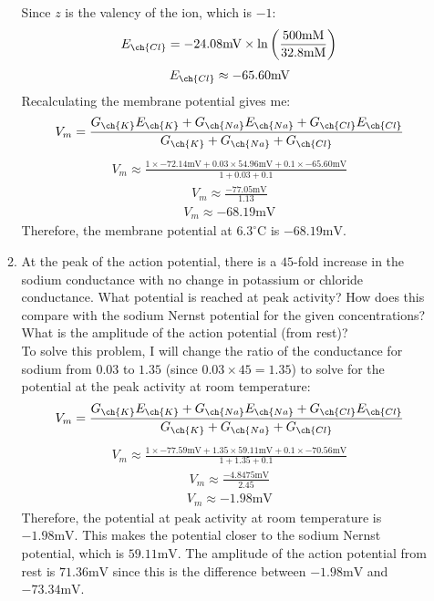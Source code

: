 \documentclass[11pt]{article}
\begin{document}
\begin{enumerate}[label=\arabic*.]
\begin{enumerate}[label=\alph*.]
Since $z$ is the valency of the  ion, which is $-1$:
\begin{align*}
E_{\ch{Cl}} = -24.08 \text{mV} \times \ln{\left(\frac{500 \text{mM}} {32.8 \text{mM}}\right)}
\end{align*}
\begin{align*}
E_{\ch{Cl}} \approx -65.60 \text{mV}
\end{align*}
Recalculating the membrane potential gives me:
\begin{align*}
V_m = \frac{G_{\ch{K}} E_{\ch{K}} + G_{\ch{Na}} E_{\ch{Na}} + G_{\ch{Cl}} E_{\ch{Cl}}} {G_{\ch{K}} + G_{\ch{Na}} + G_{\ch{Cl}}}
\end{align*}
\begin{align*}
V_m \approx \frac{1 \times -72.14 \text{mV} + 0.03 \times 54.96 \text{mV} + 0.1 \times -65.60 \text{mV}} {1 + 0.03 + 0.1}
\end{align*}
\begin{align*}
V_m \approx \frac{-77.05 \text{mV}} {1.13}
\end{align*}
\begin{align*}
V_m \approx -68.19 \text{mV}
\end{align*}
Therefore, the membrane potential at $6.3 ^{\circ}\text{C}$ is $-68.19 \text{mV}$.



\newpage
\item
At the peak of the action potential, there is a $45$-fold increase in the sodium conductance with no change in potassium or chloride conductance. What potential is reached at peak activity? How does this compare with the sodium Nernst potential for the given concentrations? What is the amplitude of the action potential (from rest)?
\vspace*{1\baselineskip}
\\
To solve this problem, I will change the ratio of the conductance for sodium from $0.03$ to $1.35$ (since $0.03 \times 45 = 1.35$) to solve for the potential at the peak activity at room temperature:
\begin{align*}
V_m = \frac{G_{\ch{K}} E_{\ch{K}} + G_{\ch{Na}} E_{\ch{Na}} + G_{\ch{Cl}} E_{\ch{Cl}}} {G_{\ch{K}} + G_{\ch{Na}} + G_{\ch{Cl}}}
\end{align*}
\begin{align*}
V_m \approx \frac{1 \times -77.59 \text{mV} + 1.35 \times 59.11 \text{mV} + 0.1 \times -70.56 \text{mV}} {1 + 1.35 + 0.1}
\end{align*}
\begin{align*}
V_m \approx \frac{-4.8475 \text{mV}} {2.45}
\end{align*}
\begin{align*}
V_m \approx -1.98 \text{mV}
\end{align*}
Therefore, the potential at peak activity at room temperature is $-1.98 \text{mV}$. This makes the potential closer to the sodium Nernst potential, which is $59.11 \text{mV}$. The amplitude of the action potential from rest is $71.36 \text{mV}$ since this is the difference between $-1.98 \text{mV}$ and $-73.34 \text{mV}$.
\end{enumerate}




\end{enumerate}
\end{document}
